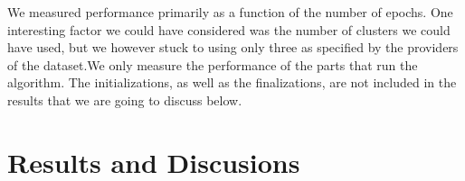 \begin{multicols*}{2}
    We measured performance primarily as a function of the number of epochs. One interesting factor we could have considered was the number of clusters we could have used, but we however stuck to using only three as specified by the providers of the dataset.We only measure the performance of the parts that run the algorithm. The initializations, as well as the finalizations, are not included in the results that we are going to discuss below.


    \section{Results and Discusions}




\end{multicols*}


